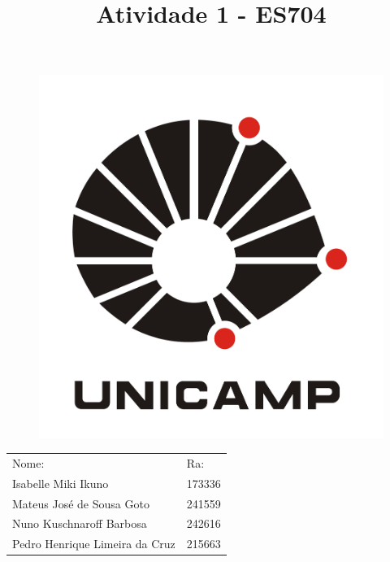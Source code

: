 \documentclass{article}
\author{}
\title{Atividade 1 - ES704}
\begin{document}
    \maketitle
    \thispagestyle{empty}

    \begin{figure}[h]
        \begin{center}
            \includegraphics[scale = 0.10]{imgs/unicamp.png}
        \end{center}
    \end{figure}

    \begin{table}[b]
        \begin{flushright}
            \begin{tabular}{ll}
                Nome: & Ra: \\ 
                Isabelle Miki Ikuno & 173336\\
                Mateus José de Sousa Goto & 241559\\
                Nuno Kuschnaroff Barbosa & 242616 \\
                Pedro Henrique Limeira da Cruz & 215663
            \end{tabular}
        \end{flushright}
    \end{table}
\end{document}
